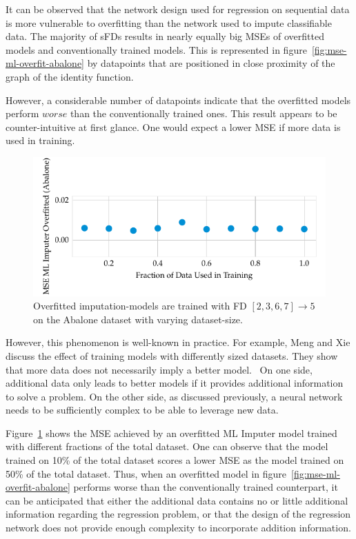 It can be observed that the network design used for regression on sequential data is more vulnerable to overfitting than the network used to impute classifiable data.
The majority of sFDs results in nearly equally big MSEs of overfitted models and conventionally trained models.
This is represented in figure~\ref{fig:mse-ml-overfit-abalone} by datapoints that are positioned in close proximity of the graph of the identity function.

However, a considerable number of datapoints indicate that the overfitted models perform \( worse \) than the conventionally trained ones.
This result appears to be counter-intuitive at first glance.
One would expect a lower MSE if more data is used in training.

\begin{figure}[ht]
     \centering
     \includegraphics[width=\textwidth]{../figures/abalone/mse-ml-overfitted-fractions.pdf}
     \caption{Overfitted imputation-models are trained with FD \( [2, 3, 6, 7] \rightarrow 5\) on the Abalone dataset with varying dataset-size.}
     \label{fig:mse-ml-overfit-fractions}
 \end{figure}

However, this phenomenon is well-known in practice.
For example, Meng and Xie discuss the effect of training models with differently sized datasets.
They show that more data does not necessarily imply a better model.~\cite[p.~1]{MEN14}
On one side, additional data only leads to better models if it provides additional information to solve a problem.
On the other side, as discussed previously, a neural network needs to be sufficiently complex to be able to leverage new data.

Figure~\ref{fig:mse-ml-overfit-fractions} shows the MSE achieved by an overfitted ML Imputer model trained with different fractions of the total dataset.
One can observe that the model trained on 10\% of the total dataset scores a lower MSE as the model trained on 50\% of the total dataset.
Thus, when an overfitted model in figure~\ref{fig:mse-ml-overfit-abalone} performs worse than the conventionally trained counterpart, it can be anticipated that either the additional data contains no or little additional information regarding the regression problem, or that the design of the regression network does not provide enough complexity to incorporate addition information.


